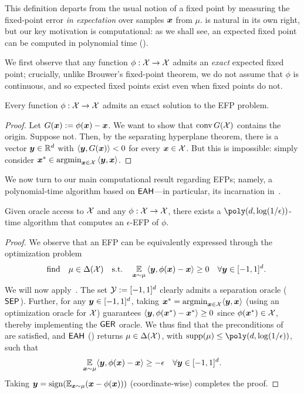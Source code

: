 This definition departs from the usual notion of a fixed point by measuring the fixed-point error \emph{in expectation} over samples ${\bm{x}}$ from $\mu$.  is natural in its own right, but our key motivation is computational: as we shall see, an expected fixed point can be computed in polynomial time ().

We first observe that any function $\phi : {\mathcal{X}} \to {\mathcal{X}}$ admits an \emph{exact} expected fixed point; crucially, unlike Brouwer's fixed-point theorem, we do not assume that $\phi$ is continuous, and so expected fixed points exist even when fixed points do not.

\begin{proposition}
    Every function $\phi : {\mathcal{X}} \to {\mathcal{X}}$ admits an exact solution to the EFP problem.
\end{proposition}

\begin{proof}
    Let $G({\bm{x}}) := \phi({\bm{x}}) - {\bm{x}}$. We want to show that $\operatorname{conv} G({\mathcal{X}})$ contains the origin. Suppose not. Then, by the separating hyperplane theorem, there is a vector ${\bm{y}} \in \mathbb R^d$ with $\ip{\vy, G(\vx)} < 0$ for every ${\bm{x}} \in {\mathcal{X}}$. But this is impossible: simply consider $\vx^* \in \argmin_{\vx\in\cX} \ip{\vy, \vx}$.
\end{proof}

We now turn to our main computational result regarding EFPs; namely, a polynomial-time algorithm based on $\textsf{EAH}$---in particular, its incarnation in~.

\begin{theorem}
    \label{th:efp}
    Given oracle access to ${\mathcal{X}}$ and any $\phi : {\mathcal{X}} \to {\mathcal{X}}$, there exists a $\poly(d, \log(1/\eps))$-time algorithm that computes an $\epsilon$-EFP of $\phi$.
\end{theorem}

\begin{proof}
    We observe that an EFP can be equivalently expressed through the optimization problem
    \begin{equation}
    \qq{find} \mu \in \Delta(\cX) \qq{s.t.} \E_{\vx \sim \mu} \ip{\vy, \phi(\vx) - \vx } \ge 0 \quad \forall \vy \in [-1, 1]^d.
\end{equation}
We will now apply~. The set ${\mathcal{Y}} := [-1, 1]^d$ clearly admits a separation oracle ($\textsf{SEP}$). Further, for any ${\bm{y}} \in [-1, 1]^d$, taking ${\bm{x}}^* = \operatorname*{argmin}_{{\bm{x}} \in {\mathcal{X}}} \langle {\bm{y}}, {\bm{x}} \rangle $ (using an optimization oracle for ${\mathcal{X}}$) guarantees $\langle {\bm{y}}, \phi({\bm{x}}^*) - {\bm{x}}^* \rangle \geq 0 $ since $\phi({\bm{x}}^*) \in {\mathcal{X}}$, thereby implementing the $\textsf{GER}$ oracle. We thus find that the preconditions of~ are satisfied, and $\textsf{EAH}$ () returns $\mu \in \Delta({\mathcal{X}})$, with $\supp(\mu) \leq \poly(d, \log(1/\epsilon))$, such that
\begin{equation}
    \operatorname*{\mathbb E}_{{\bm{x}} \sim \mu} \langle {\bm{y}}, \phi({\bm{x}}) - {\bm{x}} \rangle \geq - \epsilon \quad \forall {\bm{y}} \in [-1, 1]^d.
\end{equation}
Taking ${\bm{y}} = \operatorname{sign}( \operatorname*{\mathbb E}_{{\bm{x}} \sim \mu} ({\bm{x}} - \phi({\bm{x}})))$ (coordinate-wise) completes the proof.
\end{proof}

